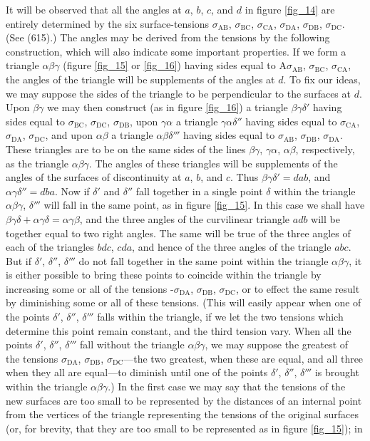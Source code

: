 \documentclass[12pt]{memoir}
\newcommand{\dd}{\delta}
\begin{document}
It will be observed that all the angles at $a$, $b$, $c$, and $d$ in figure \ref{fig_14} are entirely determined by the six surface-tensions $\sigma_{\text{AB}}$, $\sigma_{\text{BC}}$, $\sigma_{\text{CA}}$, $\sigma_{\text{DA}}$, $\sigma_{\text{DB}}$, $\sigma_{\text{DC}}$. (See (615).) The angles may be derived from the tensions by the following construction, which will also indicate some important properties. If we form a triangle $\alpha\beta\gamma$ (figure \ref{fig_15} or \ref{fig_16}) having sides equal to A$\sigma_{\text{AB}}$, $\sigma_{\text{BC}}$, $\sigma_{\text{CA}}$, the angles of the triangle will be supplements of the angles at $d$. To fix our ideas, we may suppose the sides of the triangle to be perpendicular to the surfaces at $d$. Upon $\beta\gamma$ we may then construct (as in figure \ref{fig_16}) a triangle $\beta\gamma\dd'$ having sides equal to $\sigma_{\text{BC}}$, $\sigma_{\text{DC}}$, $\sigma_{\text{DB}}$, upon $\gamma\alpha$ a triangle $\gamma\alpha\dd''$ having sides equal to $\sigma_{\text{CA}}$, $\sigma_{\text{DA}}$, $\sigma_{\text{DC}}$, and upon $\alpha\beta$ a triangle $\alpha\beta\dd'''$ having sides equal to $\sigma_{\text{AB}}$, $\sigma_{\text{DB}}$, $\sigma_{\text{DA}}$. These triangles are to be on the same sides of the lines $\beta\gamma$, $\gamma\alpha$, $\alpha\beta$, respectively, as the triangle $\alpha\beta\gamma$. The angles of these triangles will be supplements of the angles of the surfaces of discontinuity at $a$, $b$, and $c$. Thus $\beta \gamma\dd'=dab$, and $\alpha \gamma\dd''=dba$. Now if $\dd'$ and $\dd''$ fall together in a single point $\dd$ within the triangle $\alpha \beta\gamma$, $\dd'''$ will fall in the same point, as in figure \ref{fig_15}. In this case we shall have $\beta \gamma \dd + \alpha \gamma \dd =\alpha \gamma \beta$, and the three angles of the curvilinear triangle $adb$ will be together equal to two right angles. The same will be true of the three angles of each of the triangles $bdc$, $cda$, and hence of the three angles of the triangle $abc$. But if $\dd'$, $\dd''$, $\dd'''$ do not fall together in the same point within the triangle $\alpha \beta \gamma$, it is either possible to bring these points to coincide within the triangle by increasing some or all of the tensions -$\sigma_{\text{DA}}$, $\sigma_{\text{DB}}$, $\sigma_{\text{DC}}$, or to effect the same result by diminishing some or all of these tensions. (This will easily appear when one of the points $\dd'$, $\dd''$, $\dd'''$ falls within the triangle, if we let the two tensions which determine this point remain constant, and the third tension vary. When all the points $\dd'$, $\dd''$, $\dd'''$ fall without the triangle $\alpha \beta \gamma$, we may suppose the greatest of the tensions $\sigma_{\text{DA}}$, $\sigma_{\text{DB}}$, $\sigma_{\text{DC}}$---the two greatest, when these are equal, and all three when they all are equal---to diminish until one of the points $\dd'$, $\dd''$, $\dd'''$ is brought within the triangle $\alpha \beta \gamma$.) In the first case we may say that the tensions of the new surfaces are too small to be represented by the distances of an internal point from the vertices of the triangle representing the tensions of the original surfaces (or, for brevity, that they are too small to be represented as in figure \ref{fig_15}); in 
\end{document}
